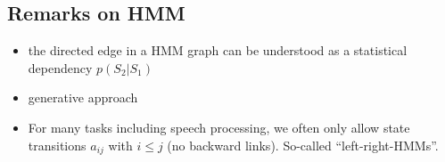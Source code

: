 \subsection{Remarks on HMM}

\begin{itemize}
    \item the directed edge in a HMM graph can be understood as a statistical dependency $p(S_2|S_1)$
    \item generative approach
    \item For many tasks including speech processing, we often only allow state transitions $a_{ij}$ with $i \le j$ (no backward links). So-called ``left-right-HMMs''.
\end{itemize}
